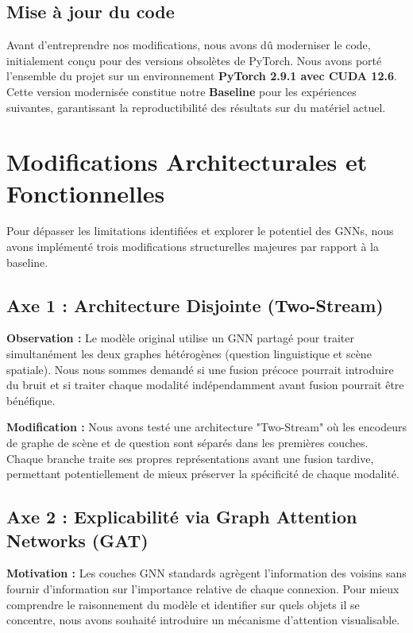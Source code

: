 \documentclass[a4paper,11pt]{article}
\begin{document}
\subsection{Mise à jour du code}
 Avant d'entreprendre nos modifications, nous avons dû moderniser le code, initialement conçu pour des versions obsolètes de PyTorch. Nous avons porté l'ensemble du projet sur un environnement \textbf{PyTorch 2.9.1 avec CUDA 12.6}. Cette version modernisée constitue notre \textbf{Baseline} pour les expériences suivantes, garantissant la reproductibilité des résultats sur du matériel actuel.

\section{Modifications Architecturales et Fonctionnelles}

Pour dépasser les limitations identifiées et explorer le potentiel des GNNs, nous avons implémenté trois modifications structurelles majeures par rapport à la baseline.

\subsection{Axe 1 : Architecture Disjointe (Two-Stream)}
\textbf{Observation :} Le modèle original utilise un GNN partagé pour traiter simultanément les deux graphes hétérogènes (question linguistique et scène spatiale). Nous nous sommes demandé si une fusion précoce pourrait introduire du bruit et si traiter chaque modalité indépendamment avant fusion pourrait être bénéfique.

\textbf{Modification :} Nous avons testé une architecture "Two-Stream" où les encodeurs de graphe de scène et de question sont séparés dans les premières couches. Chaque branche traite ses propres représentations avant une fusion tardive, permettant potentiellement de mieux préserver la spécificité de chaque modalité.

\subsection{Axe 2 : Explicabilité via Graph Attention Networks (GAT)}
\textbf{Motivation :} Les couches GNN standards agrègent l'information des voisins sans fournir d'information sur l'importance relative de chaque connexion. Pour mieux comprendre le raisonnement du modèle et identifier sur quels objets il se concentre, nous avons souhaité introduire un mécanisme d'attention visualisable.
\end{document}
